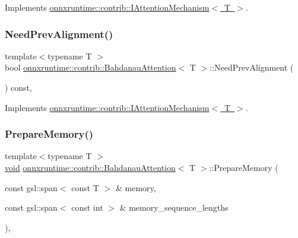 Implements \mbox{\hyperlink{classonnxruntime_1_1contrib_1_1IAttentionMechanism_a87c46bfbbc8debe139ed12e241393381}{onnxruntime\+::contrib\+::\+I\+Attention\+Mechanism$<$ T $>$}}.

\mbox{\label{classonnxruntime_1_1contrib_1_1BahdanauAttention_a1c21100a19fdbf8596cfffbe3db84661}} 
\subsubsection{\texorpdfstring{Need\+Prev\+Alignment()}{NeedPrevAlignment()}}
{\footnotesize\ttfamily template$<$typename T $>$ \\
bool \mbox{\hyperlink{classonnxruntime_1_1contrib_1_1BahdanauAttention}{onnxruntime\+::contrib\+::\+Bahdanau\+Attention}}$<$ T $>$\+::Need\+Prev\+Alignment (\begin{DoxyParamCaption}{ }\end{DoxyParamCaption}) const\hspace{0.3cm}{\ttfamily [override]}, {\ttfamily [virtual]}}



Implements \mbox{\hyperlink{classonnxruntime_1_1contrib_1_1IAttentionMechanism_a4251e6c13e13e5bc1d56fcb9687799b2}{onnxruntime\+::contrib\+::\+I\+Attention\+Mechanism$<$ T $>$}}.

\mbox{\label{classonnxruntime_1_1contrib_1_1BahdanauAttention_a085f7b9b141b95925abab3a5fffbb31f}} 
\subsubsection{\texorpdfstring{Prepare\+Memory()}{PrepareMemory()}}
{\footnotesize\ttfamily template$<$typename T $>$ \\
\mbox{\hyperlink{mlasi_8h_a88f941d423cb2a819b70a1358982b1a6}{void}} \mbox{\hyperlink{classonnxruntime_1_1contrib_1_1BahdanauAttention}{onnxruntime\+::contrib\+::\+Bahdanau\+Attention}}$<$ T $>$\+::Prepare\+Memory (\begin{DoxyParamCaption}\item[{const gsl\+::span$<$ const T $>$ \&}]{memory,  }\item[{const gsl\+::span$<$ const int $>$ \&}]{memory\+\_\+sequence\+\_\+lengths }\end{DoxyParamCaption})\hspace{0.3cm}{\ttfamily [override]}, {\ttfamily [virtual]}}



